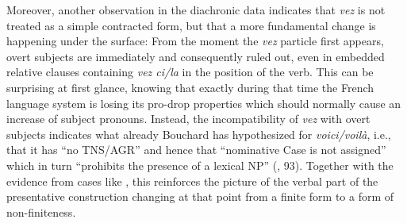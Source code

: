 \documentclass[output=paper]{langscibook}
\begin{document}
\begin{itemize}
\begin{itemize}
\begin{itemize}
\begin{itemize}
\begin{itemize}
\begin{itemize}
\begin{itemize}
\begin{itemize}
\begin{itemize}
\begin{itemize}
\begin{itemize}
\begin{itemize}
Moreover, another observation in the diachronic data indicates that \textit{vez} is not treated as a simple contracted form, but that a more fundamental change is happening under the surface: From the moment the \textit{vez} particle first appears, overt subjects are immediately and consequently ruled out, even in embedded relative clauses containing \textit{vez ci/la} in the position of the verb. This can be surprising at first glance, knowing that exactly during that time the French language system is losing its pro-drop properties which should normally cause an increase of subject pronouns. Instead, the incompatibility of \textit{vez} with overt subjects indicates what already Bouchard has hypothesized for \textit{voici/voilà}, i.e., that it has “no TNS/AGR” and hence that “nominative Case is not assigned” which in turn “prohibits the presence of a lexical NP” (\citealt{Bouchard1988}, 93). Together with the evidence from cases like , this reinforces the picture of the verbal part of the presentative construction changing at that point from a finite form to a form of non-finiteness. 


\end{itemize}
\end{itemize}
\end{itemize}
\end{itemize}
\end{itemize}
\end{itemize}
\end{itemize}
\end{itemize}
\end{itemize}
\end{itemize}
\end{itemize}
\end{itemize}
\end{document}
